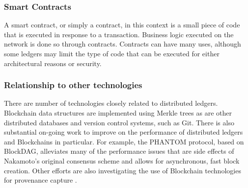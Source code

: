 \documentclass[sigconf]{acmart}
\begin{document}
\subsubsection{Smart Contracts}
A smart contract, or simply a contract, in this context is a small piece of code that is executed in response to a transaction. Business logic executed on the network is done so through contracts. Contracts can have many uses, although some ledgers may limit the type of code that can be executed for either architectural reasons or security.

\subsubsection{Relationship to other technologies}
There are number of technologies closely related to distributed ledgers. Blockchain data structures are implemented using Merkle trees \cite{merkle_digital_1987} as are other distributed databases and version control systems, such as Git. There is also substantial on-going work to improve on the performance of distributed ledgers and Blockchains in particular. For example, the PHANTOM protocol, based on BlockDAG, alleviates many of the performance issues that are side effects of Nakamoto's original consensus scheme and allows for asynchronous, fast block creation. Other efforts are also investigating the use of Blockchain technologies for provenance capture \cite{richard_brooks_and_anthony_skjellum_using_2017}\cite{worley_scrybe:_nodate}.
\end{document}
